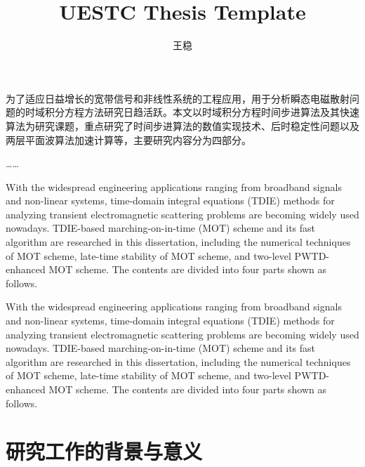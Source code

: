 \documentclass[master]{thesis-uestc}
\title{UESTC Thesis Template}
\author{王稳}
\begin{document}
\begin{chineseabstract}
为了适应日益增长的宽带信号和非线性系统的工程应用，用于分析瞬态电磁散射问题的时域积分方程方法研究日趋活跃。本文以时域积分方程时间步进算法及其快速算法为研究课题，重点研究了时间步进算法的数值实现技术、后时稳定性问题以及两层平面波算法加速计算等，主要研究内容分为四部分。

……

\end{chineseabstract}



\begin{englishabstract}
With the widespread engineering applications ranging from broadband signals and non-linear systems, time-domain integral equations (TDIE) methods for analyzing transient electromagnetic scattering problems are becoming widely used nowadays. TDIE-based marching-on-in-time (MOT) scheme and its fast algorithm are researched in this dissertation, including the numerical techniques of MOT scheme, late-time stability of MOT scheme, and two-level PWTD-enhanced MOT scheme. The contents are divided into four parts shown as follows.

With the widespread engineering applications ranging from broadband signals and non-linear systems, time-domain integral equations (TDIE) methods for analyzing transient electromagnetic scattering problems are becoming widely used nowadays. TDIE-based marching-on-in-time (MOT) scheme and its fast algorithm are researched in this dissertation, including the numerical techniques of MOT scheme, late-time stability of MOT scheme, and two-level PWTD-enhanced MOT scheme. The contents are divided into four parts shown as follows.

\end{englishabstract}

\thesistableofcontents

\thesischapterexordium

\section{研究工作的背景与意义}
\end{document}
